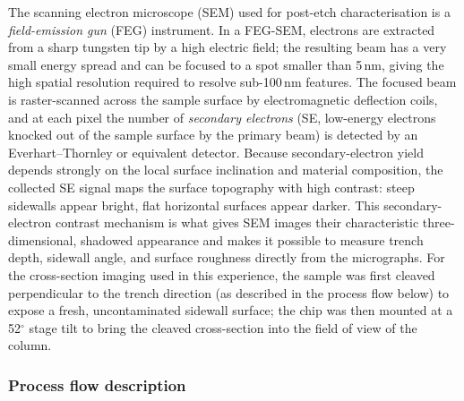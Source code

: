 The scanning electron microscope (SEM) used for post-etch characterisation is a \textit{field-emission gun} (FEG) instrument. In a FEG-SEM, electrons are extracted from a sharp tungsten tip by a high electric field; the resulting beam has a very small energy spread and can be focused to a spot smaller than 5\,nm, giving the high spatial resolution required to resolve sub-100\,nm features. The focused beam is raster-scanned across the sample surface by electromagnetic deflection coils, and at each pixel the number of \textit{secondary electrons} (SE, low-energy electrons knocked out of the sample surface by the primary beam) is detected by an Everhart--Thornley or equivalent detector. Because secondary-electron yield depends strongly on the local surface inclination and material composition, the collected SE signal maps the surface topography with high contrast: steep sidewalls appear bright, flat horizontal surfaces appear darker. This secondary-electron contrast mechanism is what gives SEM images their characteristic three-dimensional, shadowed appearance and makes it possible to measure trench depth, sidewall angle, and surface roughness directly from the micrographs. For the cross-section imaging used in this experience, the sample was first cleaved perpendicular to the trench direction (as described in the process flow below) to expose a fresh, uncontaminated sidewall surface; the chip was then mounted at a 52$^\circ$ stage tilt to bring the cleaved cross-section into the field of view of the column.

\subsubsection{Process flow description}

